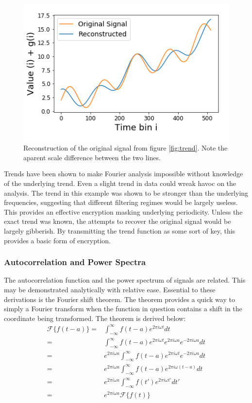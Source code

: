 \documentclass[twocolumn]{article}
\begin{document}
\begin{figure}
\centering
\includegraphics[width=\linewidth]{reconstruction_fixed}
\caption{Reconstruction of the original signal from figure \ref{fig:trend}. Note the aparent scale difference between the two lines.}
\label{fig:reconstruction_fixed}
\end{figure}

Trends have been shown to make Fourier analysis impossible without knowledge of the underlying trend. Even a slight trend in data could wreak havoc on the analysis. The trend in this example was shown to be stronger than the underlying frequencies, suggesting that different filtering regimes would be largely useless. This provides an effective encryption masking underlying periodicity. Unless the exact trend was known, the attempts to recover the original signal would be largely gibberish. By transmitting the trend function as some sort of key, this provides a basic form of encryption.

\subsubsection{Autocorrelation and Power Spectra}
The autocorrelation function and the power spectrum of signals are related. This may be demonstrated analytically with relative ease. Essential to these derivations is the Fourier shift theorem. The theorem provides a quick way to simply a Fourier transform when the function in question contains a shift in the coordinate being transformed. The theorem is derived below:
\begin{equation}
\begin{split}
\mathcal{F} \{f(t - a)\} = & \int_{-\infty}^{\infty} f(t-a) e^{2\pi i\omega t} dt \\
= & \int_{-\infty}^{\infty} f(t-a) e^{2\pi i\omega t} e^{2\pi i\omega a} e^{-2\pi i\omega a} dt \\
= & e^{2\pi i\omega a} \int_{-\infty}^{\infty} f(t-a) e^{2\pi i\omega t}  e^{-2\pi i\omega a} dt \\
= & e^{2\pi i\omega a} \int_{-\infty}^{\infty} f(t-a) e^{2\pi i\omega (t - a)} dt \\
= & e^{2\pi i\omega a} \int_{-\infty}^{\infty} f(t') e^{2\pi i\omega t'} dt' \\
= & e^{2\pi i\omega a} \mathcal{F} \{f(t)\}
\end{split}
\end{equation}
\end{document}

